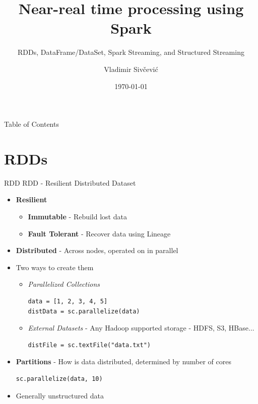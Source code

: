 \documentclass{beamer}
\title{Near-real time processing using Spark}
\subtitle{RDDs, DataFrame/DataSet, Spark Streaming, and Structured Streaming}
\author[Vladimir Siv\v{c}evi\'{c}]{Vladimir Siv\v{c}evi\'{c}}
\institute[Data Engineer]{Senior Data Engineer\\[2ex]www.vladsiv.com}
\date{\today}
\begin{document}
\frame{\titlepage}

\begin{frame}{Table of Contents}
	\tableofcontents[pausesections]
\end{frame}

\section{RDDs}
\begin{frame}[fragile]{RDD}
	RDD - Resilient Distributed Dataset
	\begin{itemize}
		\item<2-> \textbf{Resilient}
		\begin{itemize}
			\item<3-> \textbf{Immutable} - Rebuild lost data
			\item<4-> \textbf{Fault Tolerant} - Recover data using Lineage
		\end{itemize}
		\item<5-> \textbf{Distributed} - Across nodes, operated on in parallel
		\item<6-> Two ways to create them
		\begin{itemize}
			\item<7-> {
				\textit{Parallelized Collections}
				\scriptsize
				\begin{verbatim}
data = [1, 2, 3, 4, 5]
distData = sc.parallelize(data)
				\end{verbatim}
			}
			\item<8-> 
			{
				\textit{External Datasets} - Any Hadoop supported storage - HDFS, S3, HBase...
				\scriptsize
				\begin{verbatim}
distFile = sc.textFile("data.txt")
				\end{verbatim}
			}
		\end{itemize}
		\item<9-> \textbf{Partitions} - How is data distributed, determined by number of cores
				\scriptsize
				\begin{verbatim}
sc.parallelize(data, 10)
				\end{verbatim}
		\item<10-> Generally unstructured data
	\end{itemize}
\end{frame}
\end{document}
